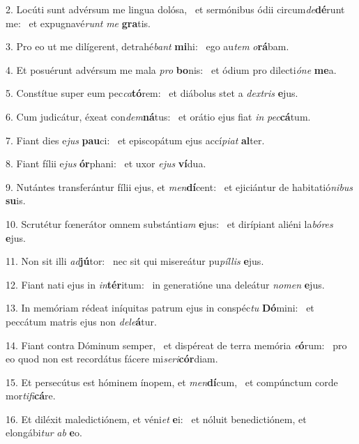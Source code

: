 2. Locúti sunt advérsum me lingua dolósa, \dag\  et sermónibus ódii circum\textit{de}\textbf{dé}runt me: \ast\  et expugnavé\textit{runt} \textit{me} \textbf{gra}tis.\

3. Pro eo ut me dilígerent, detrahé\textit{bant} \textbf{mi}hi: \ast\  ego au\textit{tem} \textit{o}\textbf{rá}bam.\

4. Et posuérunt advérsum me mala \textit{pro} \textbf{bo}nis: \ast\  et ódium pro dilecti\textit{ó}\textit{ne} \textbf{me}a.\

5. Constítue super eum pec\textit{ca}\textbf{tó}rem: \ast\  et diábolus stet a \textit{dex}\textit{tris} \textbf{e}jus.\

6. Cum judicátur, éxeat con\textit{dem}\textbf{ná}tus: \ast\  et orátio ejus fiat \textit{in} \textit{pec}\textbf{cá}tum.\

7. Fiant dies e\textit{jus} \textbf{pau}ci: \ast\  et episcopátum ejus accí\textit{pi}\textit{at} \textbf{al}ter.\

8. Fiant fílii e\textit{jus} \textbf{ór}phani: \ast\  et uxor \textit{e}\textit{jus} \textbf{ví}dua.\

9. Nutántes transferántur fílii ejus, et \textit{men}\textbf{dí}cent: \ast\  et ejiciántur de habitatió\textit{ni}\textit{bus} \textbf{su}is.\

10. Scrutétur fœnerátor omnem substánti\textit{am} \textbf{e}jus: \ast\  et dirípiant aliéni la\textit{bó}\textit{res} \textbf{e}jus.\

11. Non sit illi \textit{ad}\textbf{jú}tor: \ast\  nec sit qui misereátur pu\textit{píl}\textit{lis} \textbf{e}jus.\

12. Fiant nati ejus in \textit{in}\textbf{tér}itum: \ast\  in generatióne una deleátur \textit{no}\textit{men} \textbf{e}jus.\

13. In memóriam rédeat iníquitas patrum ejus in conspéc\textit{tu} \textbf{Dó}mini: \ast\  et peccátum matris ejus non \textit{de}\textit{le}\textbf{á}tur.\

14. Fiant contra Dóminum semper, \dag\  et dispéreat de terra memória \textit{e}\textbf{ó}rum: \ast\  pro eo quod non est recordátus fácere mi\textit{se}\textit{ri}\textbf{cór}diam.\

15. Et persecútus est hóminem ínopem, et \textit{men}\textbf{dí}cum, \ast\  et compúnctum corde mor\textit{ti}\textit{fi}\textbf{cá}re.\

16. Et diléxit maledictiónem, et véni\textit{et} \textbf{e}i: \ast\  et nóluit benedictiónem, et elongábi\textit{tur} \textit{ab} \textbf{e}o.\

